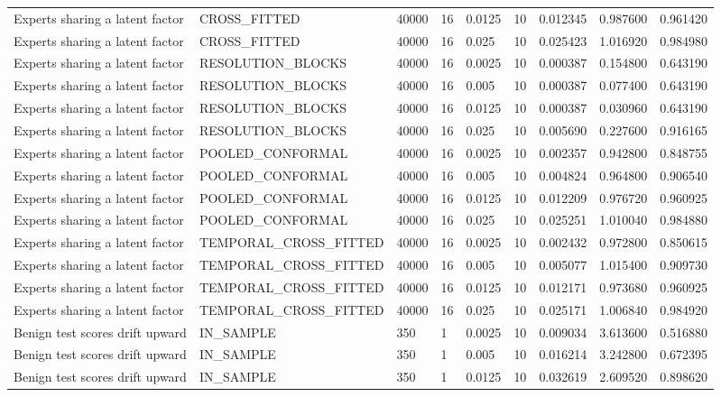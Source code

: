 \begin{tabular}{lllllllll}
Experts sharing a latent factor & CROSS\_FITTED & 40000 & 16 & 0.0125 & 10 & 0.012345 & 0.987600 & 0.961420 \\
Experts sharing a latent factor & CROSS\_FITTED & 40000 & 16 & 0.025 & 10 & 0.025423 & 1.016920 & 0.984980 \\
Experts sharing a latent factor & RESOLUTION\_BLOCKS & 40000 & 16 & 0.0025 & 10 & 0.000387 & 0.154800 & 0.643190 \\
Experts sharing a latent factor & RESOLUTION\_BLOCKS & 40000 & 16 & 0.005 & 10 & 0.000387 & 0.077400 & 0.643190 \\
Experts sharing a latent factor & RESOLUTION\_BLOCKS & 40000 & 16 & 0.0125 & 10 & 0.000387 & 0.030960 & 0.643190 \\
Experts sharing a latent factor & RESOLUTION\_BLOCKS & 40000 & 16 & 0.025 & 10 & 0.005690 & 0.227600 & 0.916165 \\
Experts sharing a latent factor & POOLED\_CONFORMAL & 40000 & 16 & 0.0025 & 10 & 0.002357 & 0.942800 & 0.848755 \\
Experts sharing a latent factor & POOLED\_CONFORMAL & 40000 & 16 & 0.005 & 10 & 0.004824 & 0.964800 & 0.906540 \\
Experts sharing a latent factor & POOLED\_CONFORMAL & 40000 & 16 & 0.0125 & 10 & 0.012209 & 0.976720 & 0.960925 \\
Experts sharing a latent factor & POOLED\_CONFORMAL & 40000 & 16 & 0.025 & 10 & 0.025251 & 1.010040 & 0.984880 \\
Experts sharing a latent factor & TEMPORAL\_CROSS\_FITTED & 40000 & 16 & 0.0025 & 10 & 0.002432 & 0.972800 & 0.850615 \\
Experts sharing a latent factor & TEMPORAL\_CROSS\_FITTED & 40000 & 16 & 0.005 & 10 & 0.005077 & 1.015400 & 0.909730 \\
Experts sharing a latent factor & TEMPORAL\_CROSS\_FITTED & 40000 & 16 & 0.0125 & 10 & 0.012171 & 0.973680 & 0.960925 \\
Experts sharing a latent factor & TEMPORAL\_CROSS\_FITTED & 40000 & 16 & 0.025 & 10 & 0.025171 & 1.006840 & 0.984920 \\
Benign test scores drift upward & IN\_SAMPLE & 350 & 1 & 0.0025 & 10 & 0.009034 & 3.613600 & 0.516880 \\
Benign test scores drift upward & IN\_SAMPLE & 350 & 1 & 0.005 & 10 & 0.016214 & 3.242800 & 0.672395 \\
Benign test scores drift upward & IN\_SAMPLE & 350 & 1 & 0.0125 & 10 & 0.032619 & 2.609520 & 0.898620 \\

\end{tabular}
